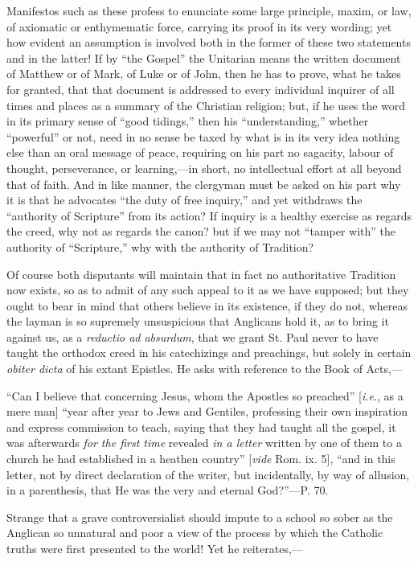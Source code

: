 Manifestos such as these profess to enunciate
some large principle, maxim, or law, of axiomatic or enthymematic
force, carrying its proof in its very wording; yet how evident an
assumption is involved both in the former of these two statements and
in the latter! If by ``the Gospel'' the Unitarian means the written
document of Matthew or of Mark, of Luke or of John, then he has to
prove, what he takes for granted, that that document is addressed to
every individual inquirer of all times and places as a summary of the
Christian religion; but, if he uses the word in its primary sense of ``good
tidings,'' then his ``understanding,'' whether ``powerful'' or not, need in
no sense be taxed by what is in its very idea nothing else than an
oral message of peace, requiring on his part no sagacity, labour of
thought, perseverance, or learning,—in short, no intellectual effort
at all beyond that of faith. And in like manner, the clergyman must be
asked on his part why it is that he advocates ``the duty of free
inquiry,'' and yet withdraws the ``authority of Scripture'' from its
action? If inquiry is a healthy exercise as regards the creed, why not
as regards the canon? but if we may not ``tamper with'' the authority of
``Scripture,'' why with the authority of Tradition?

Of course both disputants will maintain that in
fact no authoritative Tradition now exists, so as to admit of any such
appeal to it as we have supposed; but they ought to bear in mind that
others believe in its existence, if they do not, whereas the layman is
so supremely unsuspicious that Anglicans hold it, as to bring it
against us, as a \emph{reductio ad absurdum}, that we grant St. Paul
never to have taught the orthodox creed in his catechizings and
preachings, but solely in certain \emph{obiter dicta} of his extant
Epistles. He asks with reference to the Book of Acts,—

``Can
I believe that concerning Jesus, whom the Apostles so preached'' [\emph{i.e}.,
as a mere man] ``year after year to Jews and Gentiles, professing their
own inspiration and express commission to teach, saying that they had
taught all the gospel, it was afterwards \emph{for the first time}
revealed \emph{in a letter} written by one of them to a church he had
established in a heathen country'' [\emph{vide} Rom. ix. 5], ``and in
this letter, not by direct declaration of the writer, but
incidentally, by way of allusion, in a parenthesis, that He was the
very and eternal God?''—P. 70.

Strange that a grave controversialist should
impute to a school so sober as the Anglican so unnatural and poor a
view of the process by which the Catholic truths were first presented
to the world! Yet he reiterates,—

